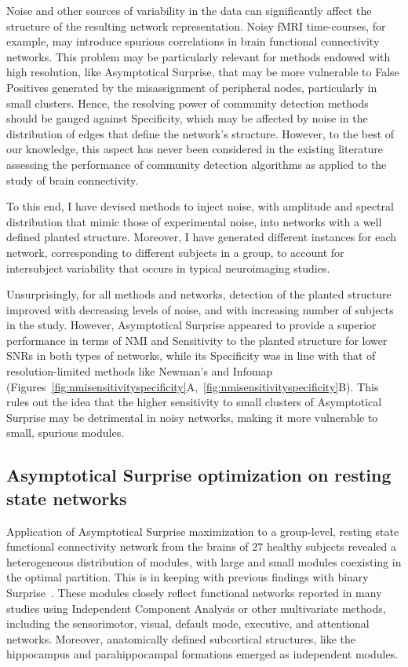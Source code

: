 Noise and other sources of variability in the data can significantly affect the structure of the resulting network representation.
Noisy fMRI time-courses, for example, may introduce spurious correlations in brain functional connectivity networks.
This problem may be particularly relevant for methods endowed with high resolution, like Asymptotical Surprise, that may be more vulnerable to False Positives generated by the misassignment of peripheral nodes, particularly in small clusters.
Hence, the resolving power of community detection methods should be gauged against Specificity, which may be affected by noise in the distribution of edges that define the network's structure.
However, to the best of our knowledge, this aspect has never been considered in the existing literature assessing the performance of community detection algorithms as applied to the study of brain connectivity.

To this end, I have devised methods to inject noise, with amplitude and spectral distribution that mimic those of experimental noise, into networks with a well defined planted structure.
Moreover, I have generated different instances for each network, corresponding to different subjects in a group, to account for intersubject variability that occurs in typical neuroimaging studies.

Unsurprisingly, for all methods and networks, detection of the planted structure improved with decreasing levels of noise, and with increasing number of subjects in the study.
However, Asymptotical Surprise appeared to provide a superior performance in terms of NMI and Sensitivity to the planted structure for lower SNRs in both types of networks, while its Specificity was in line with that of resolution-limited methods like Newman's and Infomap (Figures~\ref{fig:nmisensitivityspecificity}A,~\ref{fig:nmisensitivityspecificity}B).
This rules out the idea that the higher sensitivity to small clusters of Asymptotical Surprise may be detrimental in noisy networks, making it more vulnerable to small, spurious modules.

\subsection{Asymptotical Surprise optimization on resting state networks}
Application of Asymptotical Surprise maximization to a group-level, resting state functional connectivity network from the brains of $27$ healthy subjects revealed a heterogeneous distribution of modules, with large and small modules coexisting in the optimal partition.
This is in keeping with previous findings with binary Surprise~\cite{nicolini2016}.
These modules closely reflect functional networks reported in many studies using Independent Component Analysis or other multivariate methods, including the sensorimotor, visual, default mode, executive, and attentional networks.
Moreover, anatomically defined subcortical structures, like the hippocampus and parahippocampal formations emerged as independent modules.

